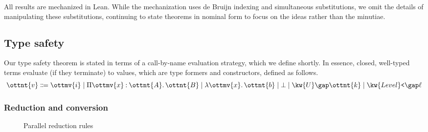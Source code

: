 \documentclass[a4paper,UKenglish,cleveref,autoref,thm-restate]{lipics-v2021}
\begin{document}
All results are mechanized in Lean.
While the mechanization uses de Bruijn indexing and simultaneous substitutions,
we omit the details of manipulating these substitutions,
continuing to state theorems in nominal form
to focus on the ideas rather than the minutiae.

\subsection{Type safety}

Our type safety theorem is stated in terms of a call-by-name evaluation strategy,
which we define shortly.
In essence, closed, well-typed terms evaluate (if they terminate) to values,
which are type formers and constructors,
defined as follows.
$$\ottnt{v} \Coloneqq \ottmv{i} \mid  \Pi  \ottmv{x}  \mathbin{:}  \ottnt{A}  \mathpunct{.}  \ottnt{B}  \mid  \lambda  \ottmv{x}  \mathpunct{.}  \ottnt{b}  \mid  \bot  \mid  \kw{U} \gap  \ottnt{k}  \mid  \kw{Level}\texttt{<} \gap  \ell $$

\subsubsection{Reduction and conversion}

\begin{figure}
\caption{Parallel reduction rules}
\label{fig:par}
\end{figure}
\end{document}

